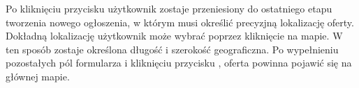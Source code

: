 Po kliknięciu przycisku  użytkownik zostaje przeniesiony do ostatniego etapu tworzenia nowego ogłoszenia, w którym musi określić precyzjną lokalizację oferty. Dokładną lokalizację użytkownik może wybrać poprzez kliknięcie na mapie. W ten sposób zostaje określona długość i szerokość geograficzna. Po wypełnieniu pozostałych pól formularza i kliknięciu przycisku , oferta powinna pojawić się na głównej mapie.\\
\\
\begin{minipage}{\linewidth}
\label{add-offer3}
\end{minipage}\\


